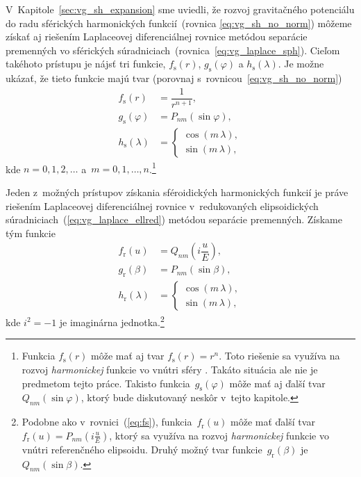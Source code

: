 \documentclass[a4paper, 12pt]{book}
\begin{document}
V~Kapitole~\ref{sec:vg_sh_expansion} sme uviedli, že rozvoj gravitačného 
potenciálu do radu sférických harmonických funkcií~(rovnica 
\ref{eq:vg_sh_no_norm}) môžeme získať aj riešením Laplaceovej diferenciálnej 
rovnice metódou separácie premenných vo sférických 
súradniciach~(rovnica~\ref{eq:vg_laplace_sph}).  Cieľom takéhoto prístupu je 
nájsť tri funkcie, $f_{\mathrm{s}}(r)$, $g_{\mathrm{s}}(\varphi)$ 
a $h_{\mathrm{s}}(\lambda)$.  Je možne ukázať, že tieto funkcie majú tvar 
(porovnaj s~rovnicou~\ref{eq:vg_sh_no_norm})
%
\begin{align}
\label{eq:fs}
f_{\mathrm{s}}(r) &= \dfrac{1}{r^{n + 1}}{,}\\
%
\label{eq:gs}
g_{\mathrm{s}}(\varphi) &= P_{nm}(\sin\varphi){,}\\
%
\label{eq:hs}
h_{\mathrm{s}}(\lambda) &=
%
\begin{cases}
\cos(m\,\lambda){,}\\
\sin(m\,\lambda){,}
\end{cases}
\end{align}
%
kde $n = 0, 1, 2, \dots$ a~$m = 0, 1, \dots, n$.\footnote{Funkcia 
$f_{\mathrm{s}}(r)$ môže mať aj tvar $f_{\mathrm{s}}(r) = r^n$.  Toto riešenie 
sa využíva na rozvoj \emph{harmonickej} funkcie vo vnútri sféry 
\parencite{MoritzPhysicalGeodesy}.  Takáto situácia ale nie je predmetom tejto 
práce.  Takisto funkcia~$g_\mathrm{s}(\varphi)$ môže mať aj ďalší 
tvar~$Q_{nm}(\sin\varphi)$, ktorý bude diskutovaný neskôr v~tejto kapitole.}

Jeden z~možných prístupov získania sféroidických harmonických funkcií je práve 
riešením Laplaceovej diferenciálnej rovnice v~redukovaných elipsoidických 
súradniciach~(\ref{eq:vg_laplace_ellred}) metódou separácie premenných.  
Získame tým funkcie \parencite{MoritzPhysicalGeodesy}
%
\begin{align}
\label{eq:fr}
f_{\mathrm{r}}(u) &=
Q_{nm}\left( i \dfrac{u}{E} \right){,}\\
%
\label{eq:gr}
g_{\mathrm{r}}(\beta) &= P_{nm}(\sin\beta){,}\\
%
\label{eq:hr}
h_{\mathrm{r}}(\lambda) &=
%
\begin{cases}
\cos(m\,\lambda){,}\\
\sin(m\,\lambda){,}
\end{cases}
\end{align}
%
kde $i^2 = -1$ je imaginárna jednotka.\footnote{Podobne ako 
v~rovnici~(\ref{eq:fs}), funkcia~$f_{\mathrm{r}}(u)$ môže mať ďalší tvar 
$f_{\mathrm{r}}(u) = P_{nm}\left( i \frac{u}{E} \right)$, ktorý sa využíva na 
rozvoj \emph{harmonickej} funkcie vo vnútri referenčného elipsoidu.  Druhý 
možný tvar funkcie~$g_\mathrm{r}(\beta)$ je~$Q_{nm}(\sin\beta)$.}
\end{document}
